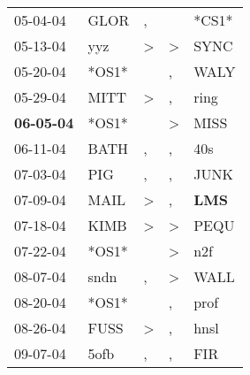 \begin{supertabular}{p{0.07\textwidth}p{0.06\textwidth}p{0.02\textwidth}p{0.02\textwidth}p{0.06\textwidth}}
          05-04-04\textsuperscript{} &           GLOR\textsuperscript{} &                , &                  &                            *CS1* \\
          05-13-04\textsuperscript{} &            yyz\textsuperscript{} &     \textgreater &     \textgreater &           SYNC\textsuperscript{} \\
          05-20-04\textsuperscript{} &                            *OS1* &                  &                , &           WALY\textsuperscript{} \\
          05-29-04\textsuperscript{} &           MITT\textsuperscript{} &     \textgreater &                , &           ring\textsuperscript{} \\
 \textbf{06-05-04\textsuperscript{}} &                            *OS1* &                  &     \textgreater &           MISS\textsuperscript{} \\
          06-11-04\textsuperscript{} &           BATH\textsuperscript{} &                , &                , &            40s\textsuperscript{} \\
          07-03-04\textsuperscript{} &            PIG\textsuperscript{} &                , &                , &           JUNK\textsuperscript{} \\
          07-09-04\textsuperscript{} &           MAIL\textsuperscript{} &     \textgreater &                , &   \textbf{LMS\textsuperscript{}} \\
          07-18-04\textsuperscript{} &           KIMB\textsuperscript{} &     \textgreater &     \textgreater &           PEQU\textsuperscript{} \\
          07-22-04\textsuperscript{} &                            *OS1* &                  &     \textgreater &            n2f\textsuperscript{} \\
          08-07-04\textsuperscript{} &           sndn\textsuperscript{} &                , &     \textgreater &           WALL\textsuperscript{} \\
          08-20-04\textsuperscript{} &                            *OS1* &                  &                , &           prof\textsuperscript{} \\
          08-26-04\textsuperscript{} &           FUSS\textsuperscript{} &     \textgreater &                , &           hnsl\textsuperscript{} \\
          09-07-04\textsuperscript{} &           5ofb\textsuperscript{} &                , &                , &            FIR\textsuperscript{} \\

\end{supertabular}

